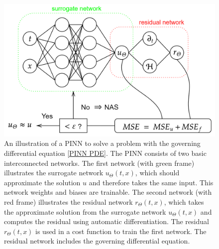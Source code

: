 \begin{figure}[H]
    \begin{center}
        \includegraphics[scale=0.3]{img/diagram-20220212.png}
    \end{center}
    \caption{An illustration of a PINN to solve a problem with the governing differential equation \cref{PINN PDE}. The PINN consists of two basic interconnected networks. The first network (with green frame) illustrates the surrogate network $u_\Theta(t,x)$, which should approximate the solution $u$ and therefore takes the same input. This network weights and biases are trainable. The second network (with red frame) illustrates the residual network $r_\Theta(t,x)$, which takes the approximate solution from the surrogate network $u_\Theta(t,x)$ and computes the residual using automatic differentiation. The residual $r_\Theta(t,x)$ is used in a cost function to train the first network. The residual network includes the governing differential equation.}
    \label{fig6}
\end{figure}

